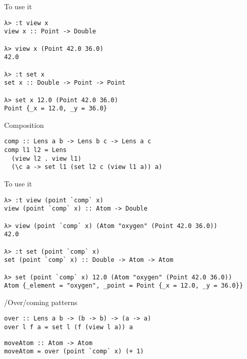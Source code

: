 \documentclass[presentation,aspectratio=169,8pt]{beamer}
\begin{document}
\begin{frame}[label={sec:orgadac9e2},fragile]{To use it}
 \begin{verbatim}
λ> :t view x
view x :: Point -> Double

λ> view x (Point 42.0 36.0)
42.0

λ> :t set x
set x :: Double -> Point -> Point

λ> set x 12.0 (Point 42.0 36.0)
Point {_x = 12.0, _y = 36.0}
\end{verbatim}
\end{frame}

\begin{frame}[label={sec:orgca9092a},fragile]{Composition}
 \begin{verbatim}
comp :: Lens a b -> Lens b c -> Lens a c
comp l1 l2 = Lens
  (view l2 . view l1)
  (\c a -> set l1 (set l2 c (view l1 a)) a)
\end{verbatim}
\end{frame}

\begin{frame}[label={sec:org67e3a8f},fragile]{To use it}
 \begin{verbatim}
λ> :t view (point `comp` x)
view (point `comp` x) :: Atom -> Double

λ> view (point `comp` x) (Atom "oxygen" (Point 42.0 36.0))
42.0

λ> :t set (point `comp` x)
set (point `comp` x) :: Double -> Atom -> Atom

λ> set (point `comp` x) 12.0 (Atom "oxygen" (Point 42.0 36.0))
Atom {_element = "oxygen", _point = Point {_x = 12.0, _y = 36.0}}
\end{verbatim}
\end{frame}

\begin{frame}[label={sec:orgf5e7382},fragile]{/Over/coming patterns}
 \begin{verbatim}
over :: Lens a b -> (b -> b) -> (a -> a)
over l f a = set l (f (view l a)) a
\end{verbatim}

\pause

\begin{verbatim}
moveAtom :: Atom -> Atom
moveAtom = over (point `comp` x) (+ 1)
\end{verbatim}
\end{frame}
\end{document}
